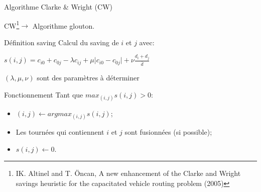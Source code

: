 \documentclass{beamer}
\begin{document}
\begin{frame}{Algorithme Clarke \& Wright (CW)}

CW\footnote{IK. Altinel and T. Öncan, A new enhancement of the Clarke and Wright savings heuristic for the capacitated vehicle routing problem (2005)}$\rightarrow$ Algorithme glouton. 

\begin{exampleblock}{Définition saving}
Calcul du saving de $i$ et $j$ avec:
\begin{center}
$s(i,j) = c_{i0} + c_{0j} - \lambda c_{ij} + \mu \vert c_{i0} - c_{0j} \vert + \nu \frac{d_i + d_j}{\overline{d}}$
\end{center}
$(\lambda,\mu,\nu)$ sont des paramètres à déterminer
\end{exampleblock}

\begin{block}{Fonctionnement}
Tant que $max_{(i,j)}s(i,j) > 0$:
\begin{itemize}
\item $(i,j) \leftarrow argmax_{(i,j)}s(i,j)$;
\item Les tournées qui contiennent $i$ et $j$ sont fusionnées (si possible);
\item $s(i,j) \leftarrow  0$.
\end{itemize} 

\end{block}
\end{frame}
\end{document}
